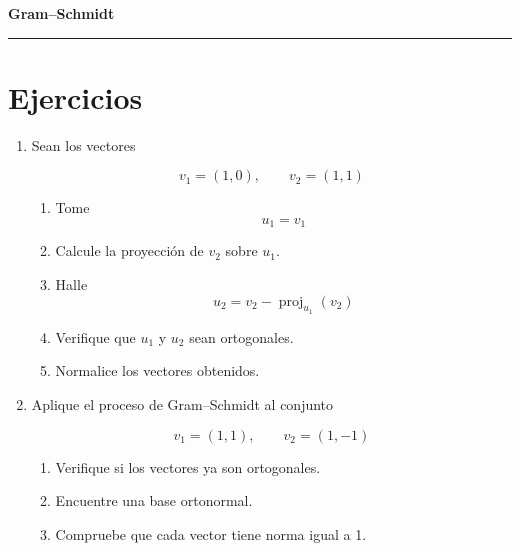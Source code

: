 \documentclass[12pt,letterpaper]{article}
\begin{document}
\begin{center}
    {\LARGE \textbf{Gram--Schmidt}}\\[0.3cm]
    \rule{\textwidth}{0.4pt}
\end{center}


\section*{Ejercicios}

\begin{enumerate}[label=\textbf{\arabic*.}]

\item Sean los vectores

\[
v_1=(1,0),
\qquad
v_2=(1,1)
\]

\begin{enumerate}[label=\alph*)]

\item Tome
\[
u_1=v_1
\]

\item Calcule la proyección de \(v_2\) sobre \(u_1\).

\item Halle
\[
u_2=v_2-\operatorname{proj}_{u_1}(v_2)
\]

\item Verifique que \(u_1\) y \(u_2\) sean ortogonales.

\item Normalice los vectores obtenidos.

\end{enumerate}

\vspace{0.5cm}

\item Aplique el proceso de Gram--Schmidt al conjunto

\[
v_1=(1,1),
\qquad
v_2=(1,-1)
\]

\begin{enumerate}[label=\alph*)]

\item Verifique si los vectores ya son ortogonales.

\item Encuentre una base ortonormal.

\item Compruebe que cada vector tiene norma igual a 1.


\end{enumerate}
\end{enumerate}
\end{document}
